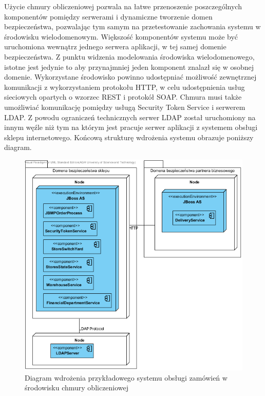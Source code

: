 Użycie chmury obliczeniowej pozwala na łatwe przenoszenie poszczególnych komponentów pomiędzy serwerami i dynamiczne tworzenie domen bezpieczeństwa, pozwalając tym samym na przetestowanie zachowania systemu w środowisku wielodomenowym. Większość komponentów systemu może być uruchomiona wewnątrz jednego serwera aplikacji, w tej samej domenie bezpieczeństwa. Z punktu widzenia modelowania środowiska wielodomenowego, istotne jest jedynie to aby przynajmniej jeden komponent znalazł się w osobnej domenie.
Wykorzystane środowisko powinno udostępniać możliwość zewnętrznej komunikacji z wykorzystaniem protokołu HTTP, w celu udostępnienia usług sieciowych opartych o wzorzec REST i protokół SOAP. Chmura musi także umożliwiać komunikację pomiędzy usługą Security Token Service i serwerem LDAP. Z powodu ograniczeń technicznych serwer LDAP został uruchomiony na innym węźle niż tym na którym jest pracuje serwer aplikacji z systemem obsługi sklepu internetowego.
Końcową strukturę wdrożenia systemu obrazuje poniższy diagram.

		\begin{figure}[h]
			\centering
			\includegraphics{img/DeploymentDiagram1.png}
			\caption{Diagram wdrożenia przykładowego systemu obsługi zamówień w środowisku chmury obliczeniowej}
			\label{DeploymentDiagram}
		\end{figure}


